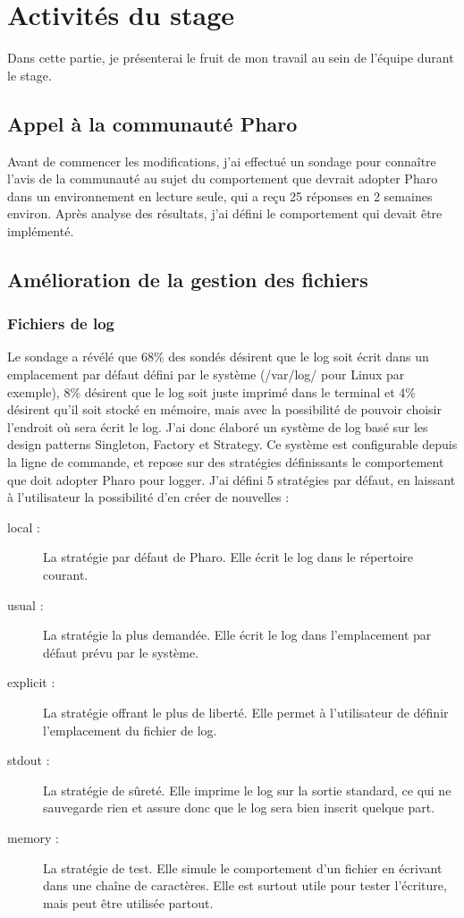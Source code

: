 \section{Activités du stage}
Dans cette partie, je présenterai le fruit de mon travail au sein de l'équipe durant le stage.

\subsection{Appel à la communauté Pharo}
Avant de commencer les modifications, j'ai effectué un sondage pour connaître l'avis de la communauté au sujet du comportement que devrait adopter Pharo dans un environnement en lecture seule, qui a reçu 25 réponses en 2 semaines environ. Après analyse des résultats, j'ai défini le comportement qui devait être implémenté.

\subsection{Amélioration de la gestion des fichiers}

\subsubsection{Fichiers de log}
Le sondage a révélé que 68\% des sondés désirent que le log soit écrit dans un emplacement par défaut défini par le système (/var/log/ pour Linux par exemple), 8\% désirent que le log soit juste imprimé dans le terminal et 4\% désirent qu'il soit stocké en mémoire, mais avec la possibilité de pouvoir choisir l'endroit où sera écrit le log. J'ai donc élaboré un système de log basé sur les design patterns Singleton, Factory et Strategy. Ce système est configurable depuis la ligne de commande, et repose sur des stratégies définissants le comportement que doit adopter Pharo pour logger. J'ai défini 5 stratégies par défaut, en laissant à l'utilisateur la possibilité d'en créer de nouvelles :

\begin{description}
	\item[local :] La stratégie par défaut de Pharo. Elle écrit le log dans le répertoire courant.
	\item[usual :] La stratégie la plus demandée. Elle écrit le log dans l'emplacement par défaut prévu par le système.
	\item[explicit :] La stratégie offrant le plus de liberté. Elle permet à l'utilisateur de définir l'emplacement du fichier de log.
	\item[stdout :] La stratégie de sûreté. Elle imprime le log sur la sortie standard, ce qui ne sauvegarde rien et assure donc que le log sera bien inscrit quelque part.
	\item[memory :] La stratégie de test. Elle simule le comportement d'un fichier en écrivant dans une chaîne de caractères. Elle est surtout utile pour tester l'écriture, mais peut être utilisée partout.
\end{description}

